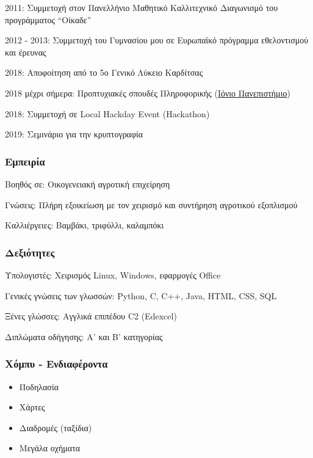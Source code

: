 2011: Συμμετοχή στον Πανελλήνιο Μαθητικό Καλλιτεχνικό Διαγωνισμό του
προγράμματος ``Οίκαδε''

2012 - 2013: Συμμετοχή του Γυμνασίου μου σε Ευρωπαϊκό πρόγραμμα
εθελοντισμού και έρευνας

2018: Αποφοίτηση από το 5ο Γενικό Λύκειο Καρδίτσας

2018 μέχρι σήμερα: Προπτυχιακές σπουδές Πληροφορικής
(\href{https://ionio.gr/}{Ιόνιο Πανεπιστήμιο})

2018: Συμμετοχή σε Local Hackday Event (Hackathon)

2019: Σεμινάριο για την κρυπτογραφία

\subsubsection{Εμπειρία}\label{ux3b5ux3bcux3c0ux3b5ux3b9ux3c1ux3afux3b1}

Βοηθός σε: Οικογενειακή αγροτική επιχείρηση

Γνώσεις: Πλήρη εξοικείωση με τον χειρισμό και συντήρηση αγροτικού
εξοπλισμού

Καλλιέργειες: Βαμβάκι, τριφύλλι, καλαμπόκι

\subsubsection{Δεξιότητες}\label{ux3b4ux3b5ux3beux3b9ux3ccux3c4ux3b7ux3c4ux3b5ux3c2}

Υπολογιστές: Χειρισμός Linux, Windows, εφαρμογές Office

Γενικές γνώσεις των γλωσσών: Python, C, C++, Java, HTML, CSS, SQL

Ξένες γλώσσες: Αγγλικά επιπέδου C2 (Edexcel)

Διπλώματα οδήγησης: Α' και Β' κατηγορίας

\subsubsection{Χόμπυ -
Ενδιαφέροντα}\label{ux3c7ux3ccux3bcux3c0ux3c5---ux3b5ux3bdux3b4ux3b9ux3b1ux3c6ux3adux3c1ux3bfux3bdux3c4ux3b1}

\begin{itemize}
\tightlist
\item
  Ποδηλασία
\item
  Χάρτες
\item
  Διαδρομές (ταξίδια)
\item
  Μεγάλα οχήματα
\end{itemize}
